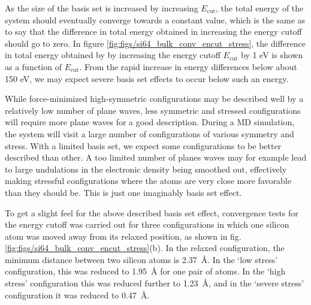 \documentclass[11pt,bibliography=totoc,index=totoc]{scrbook}   %
\begin{document}
As the size of the basis set is increased by increasing $E_{\text{cut}}$,
the total energy of the system should eventually converge towards a constant value, 
which is the same as to say that the difference in total energy obtained in increasing the energy cutoff should go to zero.
In figure \ref{fig:figs/si64_bulk_conv_encut_stress}, the difference 
in total energy obtained by by increasing the energy cutoff $E_{\text{cut}}$ by 1 eV is shown as a function of $E_{\text{cut}}$.
From the rapid increase in energy differences below about 150 eV, we may expect severe basis set effects to occur below such an energy.


While force-minimized high-symmetric configurations may be described well by a relatively low number of plane waves, 
less symmetric and stressed configurations will require more plane waves for a good description. 
During a MD simulation, the system will visit a large number of configurations of various symmetry and stress. 
With a limited basis set, we expect some configurations to be better described than other. 
A too limited number of planes waves may for example lead to large undulations in the electronic density being smoothed out, 
effectively making stressful configurations where the atoms are very close more favorable than they should be. 
This is just one imaginably basis set effect.

To get a slight feel for the above described basis set effect, convergence tests for the energy cutoff was carried out for 
three configurations in which one silicon atom was moved away from its relaxed position, as shown in fig. \ref{fig:figs/si64_bulk_conv_encut_stress}(b).
In the relaxed configuration, the minimum distance between two silicon atoms is \SI{2.37}{\angstrom}. 
In the `low stress' configuration, this was reduced to \SI{1.95}{\angstrom} for one pair of atoms. 
In the `high stress' configuration this was reduced further to \SI{1.23}{\angstrom}, and in the `severe stress' configuration it was reduced to \SI{0.47}{\angstrom}.
\end{document}
